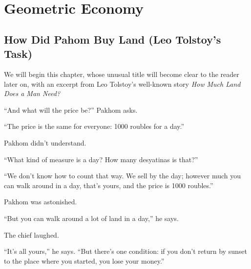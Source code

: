 



\chapter{Geometric Economy}
\label{ch-12}



\section[How Did Pahom Buy Land]{How Did Pahom Buy Land (Leo Tolstoy's Task)}
\label{sec-12.1}

We will begin this chapter, whose unusual title will become clear to the reader later on, with an excerpt from Leo Tolstoy's well-known story \emph{How Much Land Does a Man Need?}


``And what will the price be?'' Pakhom asks.

``The price is the same for everyone: 1000 roubles for a day.''

Pakhom didn’t understand.

``What kind of measure is a day? How many desyatinas is that?''

``We don't know how to count that way. We sell by the day; however much you can walk around in a day, that's yours, and the price is 1000 roubles.''

Pakhom was astonished.

``But you can walk around a lot of land in a day,'' he says.

The chief laughed.

``It's all yours,'' he says. ``But there's one condition: if you don’t return by sunset to the place where you started, you lose your money.''

